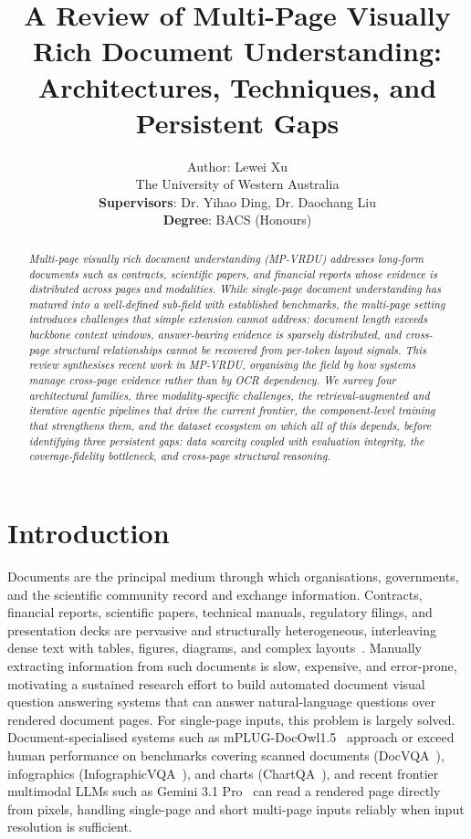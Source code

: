 \documentclass[11pt]{article}
\title{A Review of Multi-Page Visually Rich Document Understanding: Architectures, Techniques, and Persistent Gaps}
\author{Author: Lewei Xu \\
  The University of Western Australia \\
  \textbf{Supervisors}: Dr. Yihao Ding, Dr. Daochang Liu \\
  \textbf{Degree}: BACS (Honours) \\}
\begin{document}
\maketitle

\begin{abstract}
\textit{Multi-page visually rich document understanding (MP-VRDU) addresses long-form documents such as contracts, scientific papers, and financial reports whose evidence is distributed across pages and modalities. While single-page document understanding has matured into a well-defined sub-field with established benchmarks, the multi-page setting introduces challenges that simple extension cannot address: document length exceeds backbone context windows, answer-bearing evidence is sparsely distributed, and cross-page structural relationships cannot be recovered from per-token layout signals. This review synthesises recent work in MP-VRDU, organising the field by how systems manage cross-page evidence rather than by OCR dependency. We survey four architectural families, three modality-specific challenges, the retrieval-augmented and iterative agentic pipelines that drive the current frontier, the component-level training that strengthens them, and the dataset ecosystem on which all of this depends, before identifying three persistent gaps: data scarcity coupled with evaluation integrity, the coverage-fidelity bottleneck, and cross-page structural reasoning.}
\end{abstract}

\section{Introduction}
\label{sec:introduction}
Documents are the principal medium through which organisations, governments, and the scientific community record and exchange information. Contracts, financial reports, scientific papers, technical manuals, regulatory filings, and presentation decks are pervasive and structurally heterogeneous, interleaving dense text with tables, figures, diagrams, and complex layouts~\cite{tito2023hierarchical}. Manually extracting information from such documents is slow, expensive, and error-prone, motivating a sustained research effort to build automated document visual question answering systems that can answer natural-language questions over rendered document pages. For single-page inputs, this problem is largely solved. Document-specialised systems such as mPLUG-DocOwl1.5~\cite{hu2024mplugdocowl} approach or exceed human performance on benchmarks covering scanned documents (DocVQA~\cite{mathew2021docvqa}), infographics (InfographicVQA~\cite{mathew2022infographicvqa}), and charts (ChartQA~\cite{masry2022chartqa}), and recent frontier multimodal LLMs such as Gemini 3.1 Pro~\cite{google2026gemini31} can read a rendered page directly from pixels, handling single-page and short multi-page inputs reliably when input resolution is sufficient.
\end{document}
